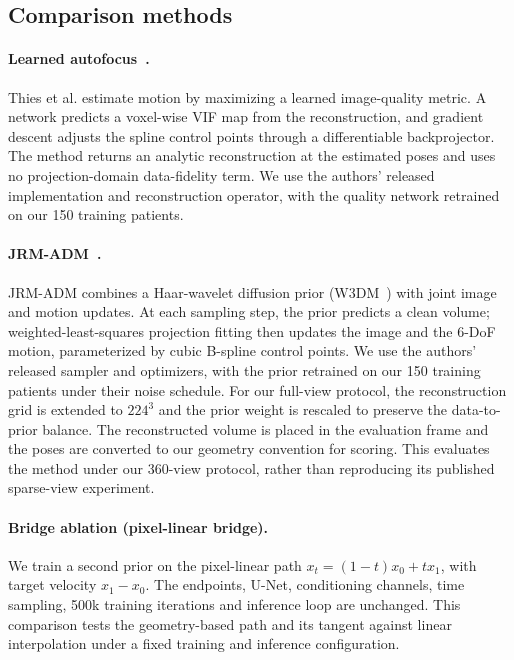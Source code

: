 \documentclass[11pt]{article}
\begin{document}
\subsection{Comparison methods}
\label{sec:baselines}

\paragraph{Learned autofocus~\cite{thies25}.}
Thies et al. estimate motion by maximizing a learned image-quality metric. A network
predicts a voxel-wise VIF map from the reconstruction, and gradient descent adjusts
the spline control points through a differentiable backprojector. The method returns
an analytic reconstruction at the estimated poses and uses no projection-domain
data-fidelity term. We use the authors' released implementation and reconstruction
operator, with the quality network retrained on our 150 training patients.

\paragraph{JRM-ADM~\cite{depaepe25}.}
JRM-ADM combines a Haar-wavelet diffusion prior (W3DM~\cite{wdm24}) with joint image
and motion updates. At each sampling step, the prior predicts a clean volume;
weighted-least-squares projection fitting then updates the image and the 6-DoF motion,
parameterized by cubic B-spline control points. We use the authors' released sampler
and optimizers, with the prior retrained on our 150 training patients under their
noise schedule. For our full-view protocol, the reconstruction grid is extended to
$224^3$ and the prior weight is rescaled to preserve the data-to-prior balance.
The reconstructed volume is placed in the evaluation frame and the poses are converted
to our geometry convention for scoring. This evaluates the method under our 360-view
protocol, rather than reproducing its published sparse-view experiment.

\paragraph{Bridge ablation (pixel-linear bridge).}
We train a second prior on the pixel-linear path $x_t=(1-t)x_0+t x_1$, with target
velocity $x_1-x_0$. The endpoints, U-Net, conditioning channels, time sampling, 500k
training iterations and inference loop are unchanged. This comparison tests the
geometry-based path and its tangent against linear interpolation under a fixed
training and inference configuration.
\end{document}

